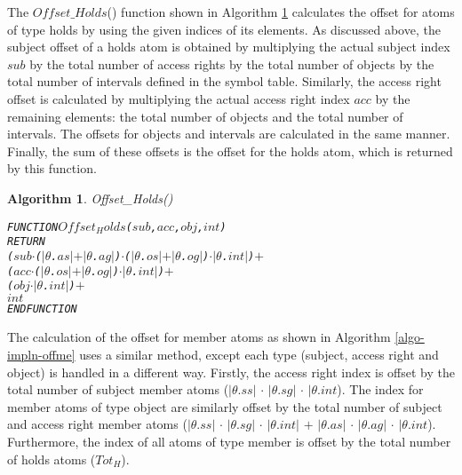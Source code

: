 \documentclass[11pt]{report}
\newenvironment{vverbatim}
{
  \begin{alltt}
}
{
    \vspace{-\baselineskip}
  \end{alltt}
}
\newtheorem{vvalgorithm}{Algorithm}[chapter]
\newenvironment{valgorithm}[2]
{
  \begin{vvalgorithm}{#1}
    \label{#2}
    \small
    \begin{vverbatim}
}
{
    \end{vverbatim}
  \end{vvalgorithm}
}
\begin{document}
        The $Offset\_Holds$() function shown in Algorithm
        \ref{algo-impln-offho} calculates the offset for atoms of type holds by
        using the given indices of its elements. As discussed above, the
        subject offset of a holds atom is obtained by multiplying the actual
        subject index $sub$ by the total number of access rights by the total
        number of objects by the total number of intervals defined in the 
        symbol table. Similarly, the access right offset is calculated by
        multiplying the actual access right index $acc$ by the remaining
        elements: the total number of objects and the total number of
        intervals. The offsets for objects and intervals are calculated in the
        same manner. Finally, the sum of these offsets is the offset for the
        holds atom, which is returned by this function.

        \begin{valgorithm}{Offset\_Holds()}{algo-impln-offho}
FUNCTION \(Offset_Holds\)(\(sub\), \(acc\), \(obj\), \(int\))
  RETURN
    (\(sub\) \(\cdot\) (\(|\)\(\theta\).\(as\)\(|\) \(+\) \(|\)\(\theta\).\(ag\)\(|\)) \(\cdot\) (\(|\)\(\theta\).\(os\)\(|\) \(+\) \(|\)\(\theta\).\(og\)\(|\)) \(\cdot\) \(|\)\(\theta\).\(int\)\(|\)) \(+\)
    (\(acc\) \(\cdot\) (\(|\)\(\theta\).\(os\)\(|\) \(+\) \(|\)\(\theta\).\(og\)\(|\)) \(\cdot\) \(|\)\(\theta\).\(int\)\(|\)) \(+\)
    (\(obj\) \(\cdot\) \(|\)\(\theta\).\(int\)\(|\)) \(+\)
    \(int\)
ENDFUNCTION
        \end{valgorithm}

        The calculation of the offset for member atoms as shown in Algorithm
         \ref{algo-impln-offme} uses a similar method, except each type
        (subject, access right and object) is handled in a different way.
        Firstly, the access right index is offset by the total number of
        subject member atoms ($|$$\theta$.$ss$$|$ $\cdot$ $|$$\theta$.$sg$$|$
        $\cdot$ $|$$\theta$.$int$). The index for member atoms of type object
        are similarly offset by the total number of subject and access right
        member atoms ($|$$\theta$.$ss$$|$ $\cdot$ $|$$\theta$.$sg$$|$
        $\cdot$ $|$$\theta$.$int$$|$ $+$ $|$$\theta$.$as$$|$ $\cdot$
        $|$$\theta$.$ag$$|$ $\cdot$ $|$$\theta$.$int$). Furthermore, the
        index of all atoms of type member is offset by the total number of
        holds atoms ($Tot_H$).
\end{document}
